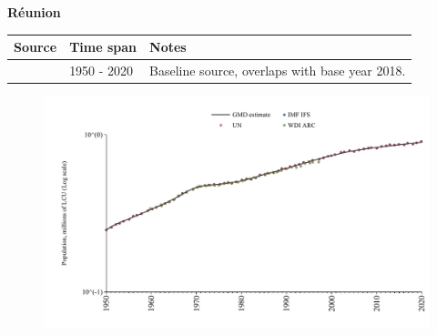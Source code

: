 \documentclass[12pt,a4paper,landscape]{article}
\begin{document}
\begin{adjustbox}{max totalsize={\paperwidth}{\paperheight},center}
\begin{minipage}[t][\textheight][t]{\textwidth}
\vspace*{0.5cm}
{}
\begin{center}
{\Large\bfseries Réunion}
\end{center}
\vspace{0.5cm}
\begin{table}[H]
\centering
\small
\begin{tabular}{|l|l|l|}
\hline
\textbf{Source} & \textbf{Time span} & \textbf{Notes} \\
\hline
\rowcolor{white}\cite{IMF_IFS}& 1950 - 2020 &Baseline source, overlaps with base year 2018.\\
\hline
\end{tabular}
\end{table}
\begin{figure}[H]
\centering
\includegraphics[width=\textwidth,height=0.6\textheight,keepaspectratio]{graphs/REU_pop.pdf}
\end{figure}
\end{minipage}
\end{adjustbox}
\end{document}
